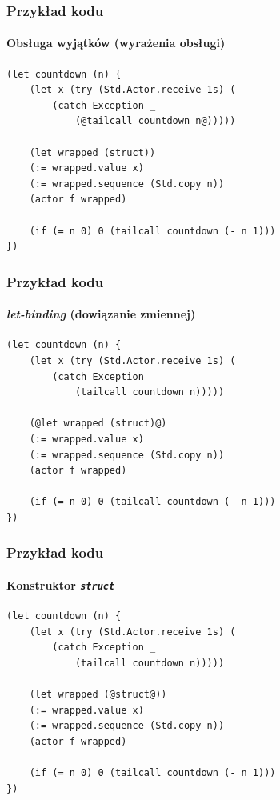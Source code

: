 \documentclass[aspectratio=169]{beamer}
\begin{document}
\begin{frame}[fragile]
    \frametitle{Przykład kodu}
    \framesubtitle{Obsługa wyjątków (wyrażenia obsługi)}

    \begin{small}
    \begin{lstlisting}
(let countdown (n) {
    (let x (try (Std.Actor.receive 1s) (
        (catch Exception _
            (@tailcall countdown n@)))))

    (let wrapped (struct))
    (:= wrapped.value x)
    (:= wrapped.sequence (Std.copy n))
    (actor f wrapped)

    (if (= n 0) 0 (tailcall countdown (- n 1)))
})
    \end{lstlisting}
    \end{small}
\end{frame}

\begin{frame}[fragile]
    \frametitle{Przykład kodu}
    \framesubtitle{\emph{let-binding} (dowiązanie zmiennej)}

    \begin{small}
    \begin{lstlisting}
(let countdown (n) {
    (let x (try (Std.Actor.receive 1s) (
        (catch Exception _
            (tailcall countdown n)))))

    (@let wrapped (struct)@)
    (:= wrapped.value x)
    (:= wrapped.sequence (Std.copy n))
    (actor f wrapped)

    (if (= n 0) 0 (tailcall countdown (- n 1)))
})
    \end{lstlisting}
    \end{small}
\end{frame}

\begin{frame}[fragile]
    \frametitle{Przykład kodu}
    \framesubtitle{Konstruktor \emph{\texttt{struct}}}

    \begin{small}
    \begin{lstlisting}
(let countdown (n) {
    (let x (try (Std.Actor.receive 1s) (
        (catch Exception _
            (tailcall countdown n)))))

    (let wrapped (@struct@))
    (:= wrapped.value x)
    (:= wrapped.sequence (Std.copy n))
    (actor f wrapped)

    (if (= n 0) 0 (tailcall countdown (- n 1)))
})
    \end{lstlisting}
    \end{small}
\end{frame}
\end{document}

